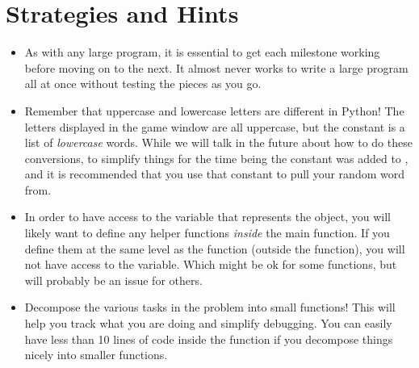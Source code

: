 \documentclass[letterpaper,12pt]{exam}
\begin{document}
\section{Strategies and Hints}
\begin{itemize}
	\item As with any large program, it is essential to get each milestone working before moving on to the next. It almost never works to write a large program all at once without testing the pieces as you go.
	\item Remember that uppercase and lowercase letters are different in Python! The letters displayed in the game window are all uppercase, but the  constant is a list of \emph{lowercase} words. While we will talk in the future about how to do these conversions, to simplify things for the time being the constant  was added to , and it is recommended that you use that constant to pull your random word from.
	\item In order to have access to the  variable that represents the  object, you will likely want to define any helper functions \emph{inside} the main  function. If you define them at the same level as the  function (outside the function), you will not have access to the  variable. Which might be ok for some functions, but will probably be an issue for others.
	\item Decompose the various tasks in the problem into small functions! This will help you track what you are doing and simplify debugging. You can easily have less than 10 lines of code inside the  function if you decompose things nicely into smaller functions.
\end{itemize}
\end{document}
